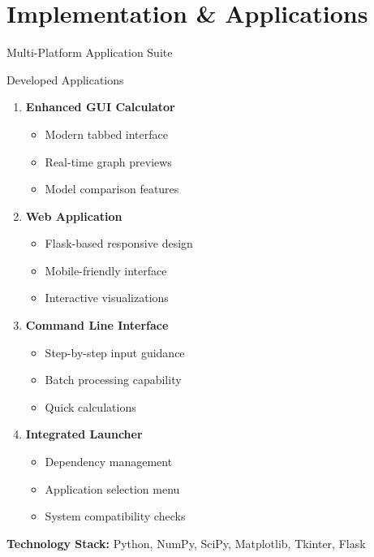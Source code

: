 \documentclass[aspectratio=169]{beamer}
\newcommand{\highlight}[1]{\textcolor{kentech_orange}{\textbf{#1}}}
\begin{document}
\section{Implementation \& Applications}

\begin{frame}{Multi-Platform Application Suite}
    \begin{block}{Developed Applications}
        \begin{multicols}{2}
            \begin{enumerate}
                \item \highlight{Enhanced GUI Calculator}
                    \begin{itemize}
                        \item Modern tabbed interface
                        \item Real-time graph previews
                        \item Model comparison features
                    \end{itemize}
                
                \item \highlight{Web Application}
                    \begin{itemize}
                        \item Flask-based responsive design
                        \item Mobile-friendly interface
                        \item Interactive visualizations
                    \end{itemize}
                
                \item \highlight{Command Line Interface}
                    \begin{itemize}
                        \item Step-by-step input guidance
                        \item Batch processing capability
                        \item Quick calculations
                    \end{itemize}
                
                \item \highlight{Integrated Launcher}
                    \begin{itemize}
                        \item Dependency management
                        \item Application selection menu
                        \item System compatibility checks
                    \end{itemize}
            \end{enumerate}
        \end{multicols}
    \end{block}
    
    \begin{center}
        \textbf{Technology Stack:} Python, NumPy, SciPy, Matplotlib, Tkinter, Flask
    \end{center}
\end{frame}
\end{document}
